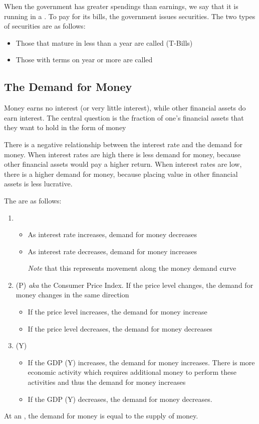 \documentclass{article}
\begin{document}
When the government has greater spendings than earnings, we say that it is running in a . To pay for its bills, the government issues securities. The two types of securities are as follows:
\begin{itemize}
  \item Those that mature in less than a year are called  (T-Bills)
  \item Those with terms on year or more are called 
\end{itemize}

\subsection{The Demand for Money}

Money earns no interest (or very little interest), while other financial assets do earn interest. The central question is the fraction of one's financial assets that they want to hold in the form of money 

\begin{remark}
  There is a negative relationship between the interest rate and the demand for money. When interest rates are high there is less demand for money, because other financial assets would pay a higher return. When interest rates are low, there is a higher demand for money, because placing value in other financial assets is less lucrative. 
\end{remark}

The  are as follows: 
\begin{enumerate}
  \item {}
    \begin{itemize}
      \item As interest rate increases, demand for money decreases 
      \item As interest rate decreases, demand for money increases 
      \item[\emph{Note}] that this represents movement along the money demand curve
    \end{itemize}
  \item {} (P) \emph{aka} the Consumer Price Index. If the price level changes, the demand for money changes in the same direction
    \begin{itemize}
      \item If the price level increases, the demand for money increase 
      \item If the price level decreases, the demand for money decreases 
    \end{itemize}
  \item {} (Y)
    \begin{itemize}
      \item If the GDP (Y) increases, the demand for money increases. There is more economic activity which requires additional money to perform these activities and thus the demand for money increases
      \item If the GDP (Y) decreases, the demand for money decreases. 
    \end{itemize}
\end{enumerate}

At an , the demand for money is equal to the supply of money. 
\end{document}
